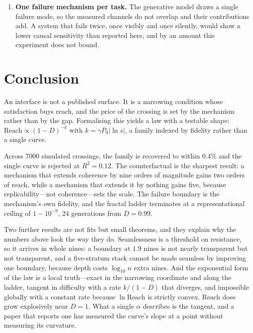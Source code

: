 \documentclass[conference]{IEEEtran}
\theoremstyle{definition}
\begin{document}
\begin{enumerate}
compares the causal judge against a rule that looks for error strings, not against
a language model reading the log. A stronger reader would move
\num{\cgWeakFcr}\% but not the ceiling, which is set by what the harness emits; the
choice is made so that the causal result cannot be an artefact of a weak opponent.
It is not evidence that any particular LLM judge is as poor as the scan.
\item \textbf{One failure mechanism per task.} The generative model draws a single
failure mode, so the measured channels do not overlap and their contributions add.
A system that fails twice, once visibly and once silently, would show a lower
causal sensitivity than reported here, and by an amount this experiment does not
bound.
\end{enumerate}

\section{Conclusion}
\label{sec:concl}

An interface is not a published surface. It is a narrowing condition whose
satisfaction buys reach, and the price of the crossing is set by the mechanism
rather than by the gap. Formalising this yields a law with a testable shape:
$\mathrm{Reach}\propto(1-D)^{-k}$ with $k=\gamma P_0\lvert\ln s\rvert$, a family
indexed by fidelity rather than a single curve.

Across \num{7000} simulated crossings, the family is recovered to within
\num{0.4}\% and the single curve is rejected at $R^2=0.12$. The counterfactual is
the sharpest result: a mechanism that extends coherence by nine orders of magnitude
gains two orders of reach, while a mechanism that extends it by nothing gains five,
because replicability---not coherence---sets the scale. The failure boundary is the
mechanism's own fidelity, and the fractal ladder terminates at a representational
ceiling of $1-10^{-9}$, \num{24} generations from $D=0.99$.

Two further results are not fits but small theorems, and they explain why the
numbers above look the way they do. Seamlessness is a threshold on resistance, so
it arrives in whole nines: a boundary at $1.9$ nines is not nearly transparent but
not transparent, and a five-stratum stack cannot be made seamless by improving one
boundary, because depth costs $\log_{10}n$ extra nines. And the exponential form
of the law is a local truth---exact in the narrowing coordinate and along the
ladder, tangent in difficulty with a rate $k/(1-D)$ that diverges, and impossible
globally with a constant rate because $\ln\mathrm{Reach}$ is strictly convex.
Reach does grow explosively near $D=1$. What a single $\alpha$ describes is the
tangent, and a paper that reports one has measured the curve's slope at a point
without measuring its curvature.
\end{document}
